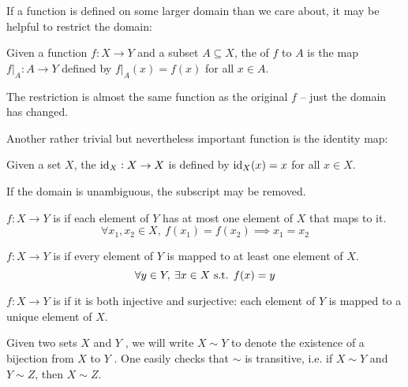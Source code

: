 If a function is defined on some larger domain than we care about, it may be helpful to restrict the domain:

\begin{definition}[Restriction]
Given a function $f:X \to Y$ and a subset $A \subseteq X$, the  of $f$ to $A$ is the map $f|_A:A \to Y$ defined by $f|_A(x) = f(x)$ for all $x \in A$.
\end{definition}

The restriction is almost the same function as the original $f$ -- just the domain has changed.

Another rather trivial but nevertheless important function is the identity map:

\begin{definition}
Given a set $X$, the  $\operatorname{id}_X:X \to X$ is defined by $\operatorname{id}_X(x) = x$ for all $x \in X$.
\end{definition}

\begin{notation}
If the domain is unambiguous, the subscript may be removed.
\end{notation}

\begin{definition}[Injectivity]
$f:X\to Y$ is  if each element of $Y$ has at most one element of $X$ that maps to it.
\[\forall x_1,x_2\in X,\:f(x_1)=f(x_2) \implies x_1=x_2\]
\end{definition}

\begin{definition}[Surjectivity]
$f:X\to Y$ is  if every element of $Y$ is mapped to at least one element of $X$.
\[ \forall y\in Y,\:\exists x\in X \text{ s.t. } f(x)=y \]
\end{definition}

\begin{definition}[Bijectivity]
$f:X\to Y$ is  if it is both injective and surjective: each element of $Y$ is mapped to a unique element of $X$.
\end{definition}

\begin{notation}
Given two sets $X$ and $Y$ , we will write $X\sim Y$ to denote the existence of a bijection from $X$ to $Y$ . One easily checks that $\sim$ is transitive, i.e. if $X\sim Y$ and $Y\sim Z$, then $X\sim Z$.
\end{notation}


